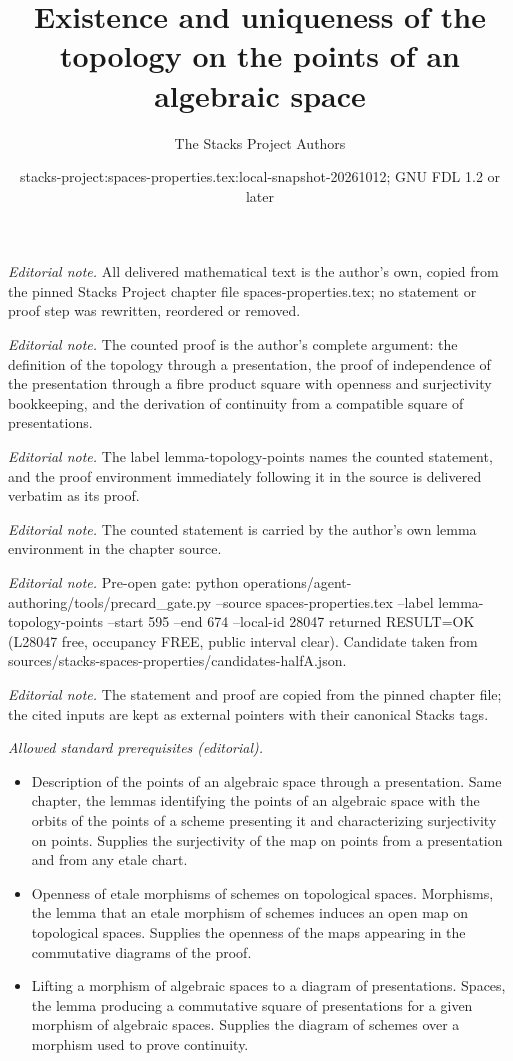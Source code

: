 \documentclass[10pt,a4paper]{amsart}
\title{Existence and uniqueness of the topology on the points of an algebraic space}
\author{The Stacks Project Authors}
\date{stacks-project:spaces-properties.tex:local-snapshot-20261012; GNU FDL 1.2 or later}
\theoremstyle{plain}
\theoremstyle{definition}
\theoremstyle{remark}
\numberwithin{equation}{subsection}
\begin{document}
\maketitle
\noindent\textit{Editorial note.} All delivered mathematical text is the author's own, copied from the pinned Stacks Project chapter file spaces-properties.tex; no statement or proof step was rewritten, reordered or removed.\par\medskip
\noindent\textit{Editorial note.} The counted proof is the author's complete argument: the definition of the topology through a presentation, the proof of independence of the presentation through a fibre product square with openness and surjectivity bookkeeping, and the derivation of continuity from a compatible square of presentations.\par\medskip
\noindent\textit{Editorial note.} The label lemma-topology-points names the counted statement, and the proof environment immediately following it in the source is delivered verbatim as its proof.\par\medskip
\noindent\textit{Editorial note.} The counted statement is carried by the author's own lemma environment in the chapter source.\par\medskip
\noindent\textit{Editorial note.} Pre-open gate: python operations/agent-authoring/tools/precard\_gate.py --source spaces-properties.tex --label lemma-topology-points --start 595 --end 674 --local-id 28047 returned RESULT=OK (L28047 free, occupancy FREE, public interval clear). Candidate taken from sources/stacks-spaces-properties/candidates-halfA.json.\par\medskip
\noindent\textit{Editorial note.} The statement and proof are copied from the pinned chapter file; the cited inputs are kept as external pointers with their canonical Stacks tags.\par\medskip
\noindent\textit{Allowed standard prerequisites (editorial).}\begin{itemize}
\item Description of the points of an algebraic space through a presentation. Same chapter, the lemmas identifying the points of an algebraic space with the orbits of the points of a scheme presenting it and characterizing surjectivity on points. Supplies the surjectivity of the map on points from a presentation and from any etale chart.
\item Openness of etale morphisms of schemes on topological spaces. Morphisms, the lemma that an etale morphism of schemes induces an open map on topological spaces. Supplies the openness of the maps appearing in the commutative diagrams of the proof.
\item Lifting a morphism of algebraic spaces to a diagram of presentations. Spaces, the lemma producing a commutative square of presentations for a given morphism of algebraic spaces. Supplies the diagram of schemes over a morphism used to prove continuity.
\end{itemize}\medskip
\end{document}
